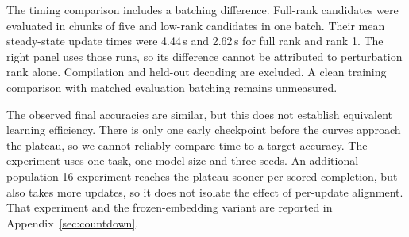The timing comparison includes a batching difference. Full-rank candidates were
evaluated in chunks of five and low-rank candidates in one batch. Their mean steady-state
update times were 4.44\,s and 2.62\,s for full rank and rank 1. The right panel uses
those runs, so its difference cannot be attributed to perturbation rank alone.
Compilation and held-out decoding are excluded. A clean training comparison with
matched evaluation batching remains unmeasured.

The observed final accuracies are similar, but this does not establish equivalent
learning efficiency. There is only one early checkpoint before the curves approach the
plateau, so we cannot reliably compare time to a target accuracy. The experiment uses
one task, one model size and three seeds. An additional population-16 experiment reaches
the plateau sooner per scored completion, but also takes more updates, so it does not
isolate the effect of per-update alignment. That experiment and the frozen-embedding
variant are reported in Appendix~\ref{sec:countdown}.

